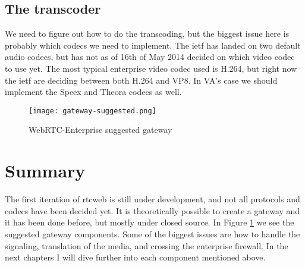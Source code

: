 \subsection{The transcoder}
We need to figure out how to do the transcoding, but the biggest issue here is probably which codecs we need to implement. The \gls{ietf} has landed on two default audio codecs, but has not as of 16th of May 2014 decided on which video codec to use yet. The most typical enterprise video codec used is H.264, but right now the \gls{ietf} are deciding between both H.264 and VP8. In VA's case we should implement the Speex and Theora codecs as well.
\\
\begin{figure}[here]
\centerline{\texttt{[image: gateway-suggested.png]}}
\caption{WebRTC-Enterprise suggested gateway}
\label{fig:gateway}
\end{figure}

\section{Summary}
The first iteration of \gls{rtcweb} is still under development, and not all protocols and codecs have been decided yet. It is theoretically possible to create a gateway and it has been done before, but mostly under closed source. In Figure \ref{fig:gateway} we see the suggested gateway components. Some of the biggest issues are how to handle the signaling, translation of the media, and crossing the enterprise firewall. In the next chapters I will dive further into each component mentioned above.
